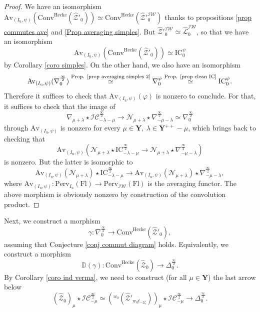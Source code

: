 \documentclass[11pt]{amsart}
\theoremstyle{plain}
\theoremstyle{remark}
\numberwithin{equation}{section}
\begin{document}
\begin{proof}
    We have an isomorphism $\mathrm{Av}_{(I_\mathrm{u},\psi)}(\mathrm{Conv}^{\mathrm{Hecke}}(\widehat{\mathcal{Z}}'_0))\simeq \mathrm{Conv}^{\mathrm{Hecke}}(\widehat{\mathcal{Z}}'^{\mathcal{IW}}_0)$ thanks to propositions \ref{prop commutes ave} and \ref{Prop averaging simples}. But $\widehat{\mathcal{Z}}'^{\mathcal{IW}}_0\simeq\widehat{\mathcal{L}}^{\mathcal{IW}}_0$, so that we have an isomorphism  
    $$\mathrm{Av}_{(I_\mathrm{u},\psi)}(\mathrm{Conv}^{\mathrm{Hecke}}(\widehat{\mathcal{Z}}'_0))\simeq \mathrm{IC}_0^\psi$$ by Corollary \ref{coro simples}. On the other hand, we also have an isomorphism 
    $$\mathrm{Av}_{(I_\mathrm{u},\psi)}( \nabla^{\frac{\infty}{2}}_{0})\overset{\text{Prop. \ref{prop averaging simples 2}}}{\simeq}\nabla^{\psi}_{0}\overset{\text{Prop. \ref{prop clean IC}}}{\simeq} \mathrm{IC}_0^\psi.$$ Therefore it suffices to check that  $\mathrm{Av}_{(I_\mathrm{u},\psi)}(\varphi)$ is nonzero to conclude. For that, it suffices to check that the image of
    $$\nabla_{\mu+\lambda}\star\mathcal{IC}_{-\lambda-\mu}^\frac{\infty}{2}\to \mathcal{N}_{\mu+\lambda}\star\nabla^{\frac{\infty}{2}}_{-\mu-\lambda}\simeq \nabla^{\frac{\infty}{2}}_{0}$$
    through $\mathrm{Av}_{(I_\mathrm{u},\psi)}$ is nonzero for every $\mu\in\mathbf{Y},~\lambda\in\mathbf{Y}^{++}-\mu$, which brings back to checking that 
    $$\mathrm{Av}_{(I_\mathrm{u},\psi)}(\mathcal{N}_{\mu+\lambda}\star\mathrm{IC}_{-\lambda-\mu}^\frac{\infty}{2}\to \mathcal{N}_{\mu+\lambda}\star\nabla^{\frac{\infty}{2}}_{-\mu-\lambda})$$
    is nonzero. But the latter is isomorphic to 
    $$\mathrm{Av}_{(I_\mathrm{u},\psi)}(\mathcal{N}_{\mu+\lambda})\star\mathrm{IC}_{-\lambda-\mu}^\frac{\infty}{2}\to \mathrm{Av}_{(I_\mathrm{u},\psi)}(\mathcal{N}_{\mu+\lambda})\star\nabla^{\frac{\infty}{2}}_{-\mu-\lambda},$$
    where $\mathrm{Av}_{(I_\mathrm{u},\psi)}:\mathrm{Perv}_{I_\mathrm{u}}(\mathrm{Fl})\to \mathrm{Perv}_{\mathcal{IW}}(\mathrm{Fl})$ is the averaging functor. The above morphism is obviously nonzero by construction of the convolution product.
\end{proof}
Next, we construct a morphism
$$\gamma:\nabla^{\frac{\infty}{2}}_0\to\mathrm{Conv}^{\mathrm{Hecke}}(\widehat{\mathcal{Z}}'_0),$$
assuming that Conjecture \ref{conj commut diagram} holds. Equivalently, we construct a morphism
$$\mathbb{D}(\gamma):\mathrm{Conv}^{\mathrm{Hecke}}(\widehat{\mathcal{Z}}_0)\to\Delta^{\frac{\infty}{2}}_0. $$
By Corollary \ref{coro ind verma}, we need to construct (for all $\mu\in\mathbf{Y}$) the last arrow below
\begin{equation}\label{eq last morphism}
    (\widehat{\mathcal{Z}}_0)_\mu\star\mathcal{IC}^{\frac{\infty}{2}}_{-\mu}\simeq ({^{w_0}(\widehat{\mathcal{Z}}'_{w_0t_{-2\zeta}})})_\mu\star\mathcal{IC}^{\frac{\infty}{2}}_{-\mu}\to \Delta^{\frac{\infty}{2}}_0.
\end{equation} 
\end{document}
